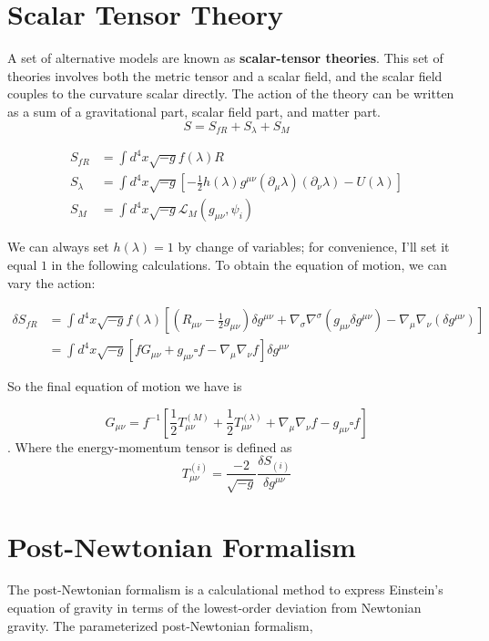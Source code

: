 \documentclass[12pt]{article}
\theoremstyle{mystyle}{\newtheorem{definition}{Definition}[subsection]}
\theoremstyle{mystyle}{\newtheorem{theorem}[definition]{Theorem}}
\theoremstyle{mystyle}{\newtheorem*{remark}{Remark}}
\theoremstyle{mystyle}{\newtheorem{example}{Example}[subsection]}
\theoremstyle{mystyle}{\newtheorem{examples}{Examples}[subsection]}
\theoremstyle{mystyle}{\newtheorem{cthm}{}[subsection]}
\begin{document}
\newpage
\section{Scalar Tensor Theory}
A set of alternative models are known as \textbf{scalar-tensor theories}.
This set of theories involves both the metric tensor and a scalar field,
and the scalar field couples to the curvature scalar directly.
The action of the theory can be written as a sum of a gravitational part, scalar field part, and matter part.
\[S = S_{fR}+S_{\lambda}+S_{M}\]
\begin{definition}
  \begin{align*}
    S_{fR}      & = \int d^4x\sqrt{-g}f(\lambda)R                                                                                            \\
    S_{\lambda} & = \int d^4x\sqrt{-g}\left[-\frac{1}{2}h(\lambda)g^{\mu\nu}(\partial_{\mu}\lambda)(\partial_{\nu}\lambda)-U(\lambda)\right] \\
    S_{M}       & = \int d^4x\sqrt{-g}\mathcal{L}_M(g_{\mu\nu},\psi_i)
  \end{align*}
\end{definition}
We can always set \(h(\lambda)=1\) by change of variables; for convenience, I'll set it equal \(1\) in the following calculations.
To obtain the equation of motion, we can vary the action:
\bigskip
\begin{cthm}
  \begin{align*}
    \delta S_{fR} & = \int d^4x \sqrt{-g}f(\lambda)\left[\left(R_{\mu\nu}-\frac{1}{2}g_{\mu\nu}\right)\delta g^{\mu\nu}+
    \nabla_{\sigma}\nabla^{\sigma}(g_{\mu\nu}\delta g^{\mu\nu})-\nabla_{\mu}\nabla_{\nu}(\delta g^{\mu\nu})\right]               \\
                  & =\int d^4x \sqrt{-g}\left[fG_{\mu\nu}+g_{\mu\nu}\square f- \nabla_{\mu}\nabla_{\nu}f\right]\delta g^{\mu\nu}
  \end{align*}
\end{cthm}
So the final equation of motion we have is
\begin{cthm}
  \[G_{\mu\nu}= f^{-1}\left[\frac{1}{2}T^{(M)}_{\mu\nu}+ \frac{1}{2}T^{(\lambda)}_{\mu\nu}+\nabla_{\mu}\nabla_{\nu}f-g_{\mu\nu}\square f\right]\].
  Where the energy-momentum tensor is defined as \[T_{\mu\nu}^{(i)}= \frac{-2}{\sqrt{-g}}\frac{\delta S_{(i)}}{\delta g^{\mu\nu}}\]
\end{cthm}




\section{Post-Newtonian Formalism}
The post-Newtonian formalism is a calculational method to express Einstein's equation of gravity in terms of the lowest-order deviation from Newtonian gravity.
The parameterized post-Newtonian formalism,
\newpage
\end{document}
